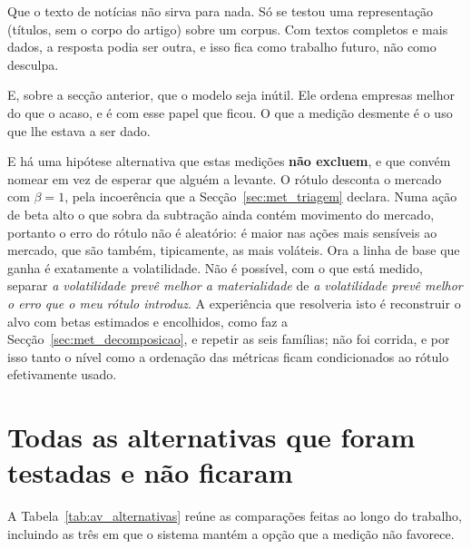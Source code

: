 Que o texto de notícias não sirva para nada. Só se testou uma representação (títulos, sem o corpo
do artigo) sobre um corpus. Com textos completos e mais dados, a resposta podia ser outra, e isso
fica como trabalho futuro, não como desculpa.

E, sobre a secção anterior, que o modelo seja inútil. Ele ordena empresas melhor do que o acaso, e é
com esse papel que ficou. O que a medição desmente é o uso que lhe estava a ser dado.

E há uma hipótese alternativa que estas medições \textbf{não excluem}, e que convém nomear em vez
de esperar que alguém a levante. O rótulo desconta o mercado com $\beta = 1$, pela incoerência que
a Secção~\ref{sec:met_triagem} declara. Numa ação de beta alto o que sobra da subtração ainda
contém movimento do mercado, portanto o erro do rótulo não é aleatório: é maior nas ações mais
sensíveis ao mercado, que são também, tipicamente, as mais voláteis. Ora a linha de base que ganha
é exatamente a volatilidade. Não é possível, com o que está medido, separar \emph{a volatilidade
prevê melhor a materialidade} de \emph{a volatilidade prevê melhor o erro que o meu rótulo
introduz}. A experiência que resolveria isto é reconstruir o alvo com betas estimados e encolhidos,
como faz a Secção~\ref{sec:met_decomposicao}, e repetir as seis famílias; não foi corrida, e por
isso tanto o nível como a ordenação das métricas ficam condicionados ao rótulo efetivamente usado.

\section{Todas as alternativas que foram testadas e não ficaram}
\label{sec:av_alternativas}

A Tabela~\ref{tab:av_alternativas} reúne as comparações feitas ao longo do trabalho, incluindo as
três em que o sistema mantém a opção que a medição não favorece.

